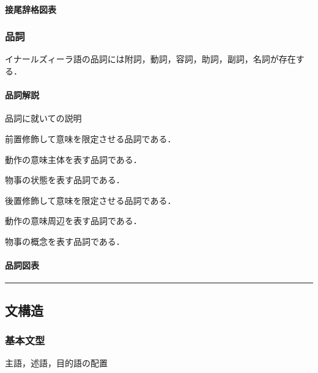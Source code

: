 \documentclass[
  japanese,
]{article}
\providecommand{\tightlist}{%
  \setlength{\itemsep}{0pt}\setlength{\parskip}{0pt}}
\begin{document}
\paragraph{接尾辞格図表}\label{subsection5.5.2}

\subsubsection{品詞}\label{section5.6}

イナールズィーラ語の品詞には附詞，動詞，容詞，助詞，副詞，名詞が存在する．

\paragraph{品詞解説}\label{subsection5.6.1}

品詞に就いての説明

\begin{description}
\tightlist
\item[附詞]
前置修飾して意味を限定させる品詞である．
\item[動詞]
動作の意味主体を表す品詞である．
\item[容詞]
物事の状態を表す品詞である．
\item[助詞]
後置修飾して意味を限定させる品詞である．
\item[副詞]
動作の意味周辺を表す品詞である．
\item[名詞]
物事の概念を表す品詞である．
\end{description}

\paragraph{品詞図表}\label{subsection5.6.2}

\begin{center}\rule{0.5\linewidth}{0.5pt}\end{center}

\subsection{文構造}\label{chapter6}

\subsubsection{基本文型}\label{section6.1}

主語，述語，目的語の配置

\begin{description}
\tightlist
\item[]
\end{description}
\end{document}
